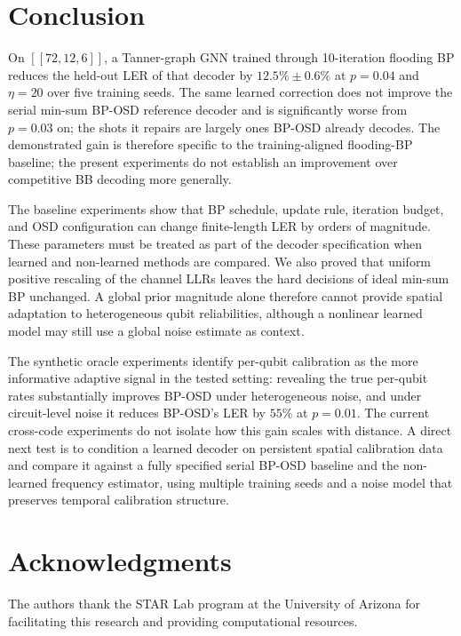 \documentclass[a4paper,twocolumn,11pt,nopdfoutputerror]{quantumarticle}
\newcommand{\code}[3]{\ensuremath{[\![#1,#2,#3]\!]}}
\begin{document}
\section{Conclusion}\label{sec:conclusion}

On $\code{72}{12}{6}$, a Tanner-graph GNN trained through
10-iteration flooding BP reduces the held-out LER of that decoder by
$12.5\%\pm0.6\%$ at $p=0.04$ and $\eta=20$ over five training seeds. The
same learned correction does not improve the serial min-sum BP-OSD
reference decoder and is significantly worse from $p=0.03$ on; the shots
it repairs are largely ones BP-OSD already decodes. The demonstrated gain is therefore specific
to the training-aligned flooding-BP baseline; the present experiments do
not establish an improvement over competitive BB decoding more generally.

The baseline experiments show that BP schedule, update rule, iteration
budget, and OSD configuration can change finite-length LER by orders of
magnitude. These parameters must be treated as part of the decoder
specification when learned and non-learned methods are compared. We also
proved that uniform positive rescaling of the channel LLRs leaves the
hard decisions of ideal min-sum BP unchanged. A global prior magnitude
alone therefore cannot provide spatial adaptation to heterogeneous qubit
reliabilities, although a nonlinear learned model may still use a global
noise estimate as context.

The synthetic oracle experiments identify per-qubit calibration as the
more informative adaptive signal in the tested setting: revealing the
true per-qubit rates substantially improves BP-OSD under heterogeneous
noise, and under circuit-level noise it reduces BP-OSD's LER by $55\%$ at
$p=0.01$. The current cross-code experiments do not
isolate how this gain scales with distance. A direct next test is to condition a
learned decoder on persistent spatial calibration data and compare it
against a fully specified serial BP-OSD baseline and the non-learned
frequency estimator, using multiple training seeds and a noise model that
preserves temporal calibration structure.
\section*{Acknowledgments}

The authors thank the STAR Lab program at the University of Arizona
for facilitating this research and providing computational resources.
\end{document}
